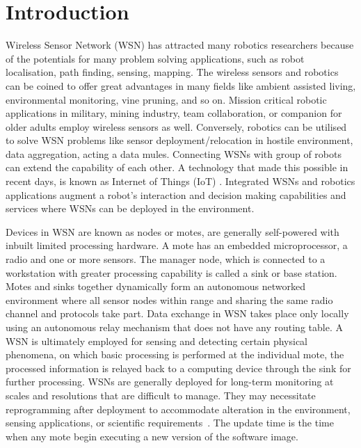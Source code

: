 \documentclass[conference,final]{IEEEtran}
\begin{document}
\section{Introduction}
\label{sec:intro}

Wireless Sensor Network (WSN) has attracted many robotics researchers because of the potentials for many problem solving applications, such as robot localisation, path finding, sensing, mapping. 
The wireless sensors and robotics can be coined to offer great advantages in many fields like ambient assisted living, environmental monitoring, vine pruning, and so on.
Mission critical robotic applications in military, mining industry, team collaboration, or companion for older adults employ wireless sensors as well.
Conversely, robotics can be utilised to solve WSN problems like sensor deployment/relocation in hostile environment, data aggregation, acting a data mules.
Connecting WSNs with group of robots can extend the capability of each other.
A technology that made this possible in recent days, is known as Internet of Things (IoT) .
Integrated WSNs and robotics applications augment a robot's interaction and decision making capabilities and services where WSNs can be deployed in the environment.

Devices in WSN are known as nodes or motes, are generally self-powered with inbuilt limited processing hardware.
A mote has an embedded microprocessor, a radio and one or more sensors.
The manager node, which is connected to a workstation with greater processing capability is called a sink or base station. 
Motes and sinks together dynamically form an autonomous networked environment where all sensor nodes within range and sharing the same radio channel and protocols take part.
Data exchange in WSN takes place only locally using an autonomous relay mechanism that does not have any routing table. 
A WSN is ultimately employed for sensing and detecting certain physical phenomena, on which basic processing is performed at the individual mote, the processed information is relayed back to a computing device  through the sink for further processing.
WSNs are generally deployed for long-term monitoring at scales and resolutions that are difficult to manage. 
They may necessitate reprogramming after deployment to accommodate alteration in the environment, sensing applications, or scientific requirements~\cite{ISI:000253439700120}.
The update time is the time when any mote begin executing a new version of the software image.
\end{document}
